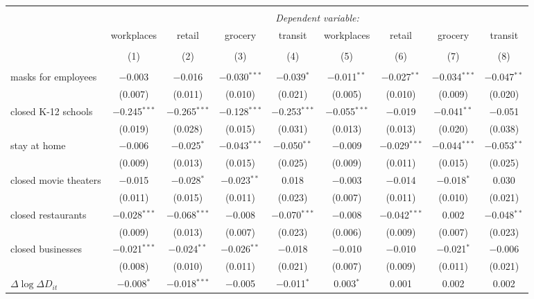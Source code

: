 \begin{tabular}{@{\extracolsep{1pt}}lcccccccc} 
\\[-1.8ex]\hline 
\hline \\[-1.8ex] 
 & \multicolumn{8}{c}{\textit{Dependent variable:}} \\ 
\cline{2-9} 
 & workplaces & retail & grocery & transit & workplaces & retail & grocery & transit \\ 
\\[-1.8ex] & (1) & (2) & (3) & (4) & (5) & (6) & (7) & (8)\\ 
\hline \\[-1.8ex] 
 masks for employees & $-$0.003 & $-$0.016 & $-$0.030$^{***}$ & $-$0.039$^{*}$ & $-$0.011$^{**}$ & $-$0.027$^{**}$ & $-$0.034$^{***}$ & $-$0.047$^{**}$ \\ 
  & (0.007) & (0.011) & (0.010) & (0.021) & (0.005) & (0.010) & (0.009) & (0.020) \\ 
  closed K-12 schools & $-$0.245$^{***}$ & $-$0.265$^{***}$ & $-$0.128$^{***}$ & $-$0.253$^{***}$ & $-$0.055$^{***}$ & $-$0.019 & $-$0.041$^{**}$ & $-$0.051 \\ 
  & (0.019) & (0.028) & (0.015) & (0.031) & (0.013) & (0.013) & (0.020) & (0.038) \\ 
  stay at home & $-$0.006 & $-$0.025$^{*}$ & $-$0.043$^{***}$ & $-$0.050$^{**}$ & $-$0.009 & $-$0.029$^{***}$ & $-$0.044$^{***}$ & $-$0.053$^{**}$ \\ 
  & (0.009) & (0.013) & (0.015) & (0.025) & (0.009) & (0.011) & (0.015) & (0.025) \\ 
  closed movie theaters & $-$0.015 & $-$0.028$^{*}$ & $-$0.023$^{**}$ & 0.018 & $-$0.003 & $-$0.014 & $-$0.018$^{*}$ & 0.030 \\ 
  & (0.011) & (0.015) & (0.011) & (0.023) & (0.007) & (0.011) & (0.010) & (0.021) \\ 
  closed restaurants & $-$0.028$^{***}$ & $-$0.068$^{***}$ & $-$0.008 & $-$0.070$^{***}$ & $-$0.008 & $-$0.042$^{***}$ & 0.002 & $-$0.048$^{**}$ \\ 
  & (0.009) & (0.013) & (0.007) & (0.023) & (0.006) & (0.009) & (0.007) & (0.023) \\ 
  closed businesses & $-$0.021$^{***}$ & $-$0.024$^{**}$ & $-$0.026$^{**}$ & $-$0.018 & $-$0.010 & $-$0.010 & $-$0.021$^{*}$ & $-$0.006 \\ 
  & (0.008) & (0.010) & (0.011) & (0.021) & (0.007) & (0.009) & (0.011) & (0.021) \\ 
  $\Delta \log \Delta D_{it}$ & $-$0.008$^{*}$ & $-$0.018$^{***}$ & $-$0.005 & $-$0.011$^{*}$ & 0.003$^{*}$ & 0.001 & 0.002 & 0.002 \\ 

\end{tabular}
